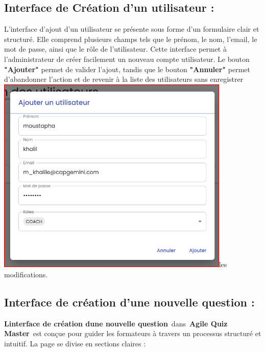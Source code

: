 \documentclass[12pt,a4paper,twoside]{report}
\begin{document}
\hypertarget{interface-de-cruxe9ation-dun-utilisateur}{%
\subsection{Interface de Création d'un utilisateur
:}\label{interface-de-cruxe9ation-dun-utilisateur}}

L'interface d'ajout d'un utilisateur se présente sous forme d'un
formulaire clair et structuré. Elle comprend plusieurs champs tels que
le prénom, le nom, l'email, le mot de passe, ainsi que le rôle de
l'utilisateur. Cette interface permet à l'administrateur de créer
facilement un nouveau compte utilisateur. Le bouton \textbf{"Ajouter"}
permet de valider l'ajout, tandis que le bouton \textbf{"Annuler"}
permet d'abandonner l'action et de revenir à la liste des utilisateurs
sans enregistrer
\includegraphics[width=4.38217in,height=3.72241in]{latex_media/media/image54.png}les
modifications.

\hypertarget{interface-de-cruxe9ation-dune-nouvelle-question}{%
\subsection{Interface de création d'une nouvelle question
:}\label{interface-de-cruxe9ation-dune-nouvelle-question}}

\textbf{L\textquotesingle interface de création d\textquotesingle une
nouvelle question}~dans~\textbf{Agile Quiz Master}~est conçue pour
guider les formateurs à travers un processus structuré et intuitif. La
page se divise en sections claires :
\end{document}
